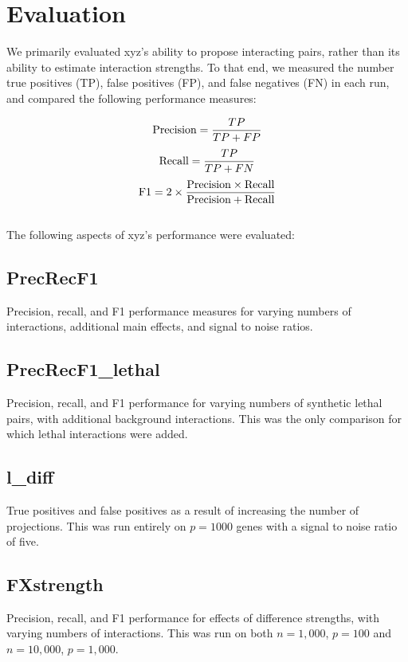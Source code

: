 \section{Evaluation}

We primarily evaluated xyz's ability to propose interacting pairs, rather than its ability to estimate interaction strengths. To that end, we measured the number true positives (TP), false positives (FP), and false negatives (FN) in each run, and compared the following performance measures:

$$\textnormal{Precision} = \frac{TP}{TP + FP}$$
$$\textnormal{Recall} = \frac{TP}{TP + FN}$$
$$\textnormal{F1} = 2 \times \frac{\textnormal{Precision} \times \textnormal{Recall}}{\textnormal{Precision} + \textnormal{Recall}}$$
~\\
The following aspects of xyz's performance were evaluated:

\subsection{PrecRecF1}
Precision, recall, and F1 performance measures for varying numbers of interactions, additional main effects, and signal to noise ratios.

\subsection{PrecRecF1\_lethal}
Precision, recall, and F1 performance for varying numbers of synthetic lethal pairs, with additional background interactions. This was the only comparison for which lethal interactions were added.

\subsection{l\_diff}
True positives and false positives as a result of increasing the number of projections. This was run entirely on $p = 1000$ genes with a signal to noise ratio of five.

\subsection{FXstrength}
Precision, recall, and F1 performance for effects of difference strengths, with varying numbers of interactions. This was run on both $n = 1,000$, $p = 100$ and $n = 10,000$, $p = 1,000$.

